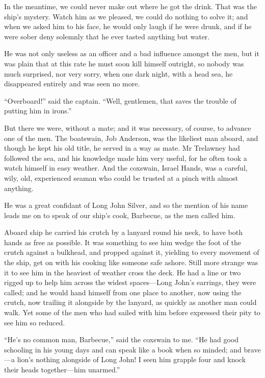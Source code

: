 In the meantime, we could never make out where he got the drink. That was the ship’s mystery. Watch him as we pleased, we could do nothing to solve it; and when we asked him to his face, he would only laugh if he were drunk, and if he were sober deny solemnly that he ever tasted anything but water.

He was not only useless as an officer and a bad influence amongst the men, but it was plain that at this rate he must soon kill himself outright, so nobody was much surprised, nor very sorry, when one dark night, with a head sea, he disappeared entirely and was seen no more.

\enquote{Overboard!} said the captain. \enquote{Well, gentlemen, that saves the trouble of putting him in irons.}

But there we were, without a mate; and it was necessary, of course, to advance one of the men. The boatswain, Job Anderson, was the likeliest man aboard, and though he kept his old title, he served in a way as mate. Mr Trelawney had followed the sea, and his knowledge made him very useful, for he often took a watch himself in easy weather. And the coxswain, Israel Hands, was a careful, wily, old, experienced seaman who could be trusted at a pinch with almost anything.

He was a great confidant of Long John Silver, and so the mention of his name leads me on to speak of our ship’s cook, Barbecue, as the men called him.

Aboard ship he carried his crutch by a lanyard round his neck, to have both hands as free as possible. It was something to see him wedge the foot of the crutch against a bulkhead, and propped against it, yielding to every movement of the ship, get on with his cooking like someone safe ashore. Still more strange was it to see him in the heaviest of weather cross the deck. He had a line or two rigged up to help him across the widest spaces---Long John’s earrings, they were called; and he would hand himself from one place to another, now using the crutch, now trailing it alongside by the lanyard, as quickly as another man could walk. Yet some of the men who had sailed with him before expressed their pity to see him so reduced.

\enquote{He’s no common man, Barbecue,} said the coxswain to me. \enquote{He had good schooling in his young days and can speak like a book when so minded; and brave---a lion’s nothing alongside of Long John! I seen him grapple four and knock their heads together---him unarmed.}

